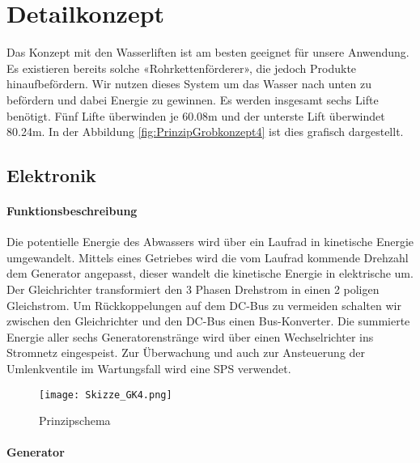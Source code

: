 \section{Detailkonzept} \label{sec:detailkonzept}

Das Konzept mit den Wasserliften ist am besten geeignet für unsere Anwendung. Es existieren bereits solche «Rohrkettenförderer», die jedoch Produkte hinaufbefördern. Wir nutzen dieses System um das Wasser nach unten zu befördern und dabei Energie zu gewinnen. Es werden insgesamt sechs Lifte benötigt. Fünf Lifte überwinden je 60.08\si{m} und der unterste Lift überwindet 80.24\si{m}. In der Abbildung \ref{fig:PrinzipGrobkonzept4}  ist dies grafisch dargestellt.


\newpage

\subsection{Elektronik}


\paragraph{Funktionsbeschreibung}
Die potentielle Energie des Abwassers wird über ein Laufrad in kinetische Energie umgewandelt. Mittels eines Getriebes wird die vom Laufrad kommende Drehzahl dem Generator angepasst, dieser wandelt die kinetische Energie in elektrische um. Der Gleichrichter transformiert den 3 Phasen Drehstrom in einen 2 poligen Gleichstrom. Um Rückkoppelungen auf dem DC-Bus zu vermeiden schalten wir zwischen den Gleichrichter und den DC-Bus einen Bus-Konverter. Die summierte Energie aller sechs Generatorenstränge wird über einen Wechselrichter ins Stromnetz eingespeist.
Zur Überwachung und auch zur Ansteuerung der Umlenkventile im Wartungsfall wird eine SPS verwendet.

\begin{figure}[H]
\centering
\texttt{[image: Skizze\_GK4.png]}
\caption{Prinzipschema}
\label{fig:Prinzipschema}
\end{figure}

\newpage

\paragraph{Generator}

